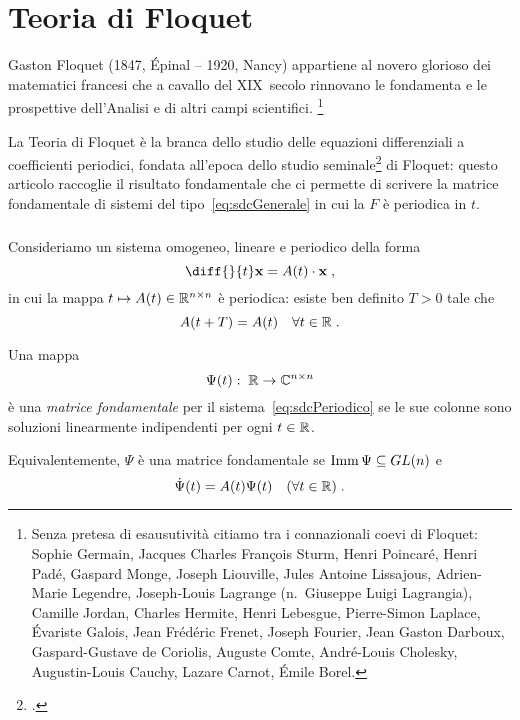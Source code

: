 \chapter{Teoria di Floquet}
\label{chap:floquetTheory}
Gaston Floquet (1847, Épinal -- 1920, Nancy)
appartiene al novero glorioso dei matematici francesi che a cavallo del XIX~secolo rinnovano
le fondamenta e le prospettive dell'Analisi e di altri campi scientifici.
\footnote{Senza pretesa di esausutività citiamo tra i connazionali coevi di Floquet: Sophie Germain,
Jacques Charles François Sturm, Henri Poincaré, Henri Padé, Gaspard Monge, Joseph Liouville,
Jules Antoine Lissajous, Adrien-Marie Legendre, Joseph-Louis Lagrange (n.~Giuseppe Luigi Lagrangia),
Camille Jordan, Charles Hermite, Henri Lebesgue, Pierre-Simon Laplace,
Évariste Galois, Jean Frédéric Frenet, Joseph Fourier, Jean Gaston Darboux, Gaspard-Gustave de Coriolis,
Auguste Comte, André-Louis Cholesky, Augustin-Louis Cauchy, Lazare Carnot, Émile Borel.}

La Teoria di Floquet è la branca dello studio delle equazioni differenziali a coefficienti periodici,
fondata all'epoca dello studio seminale\footcite{gFloquet} di Floquet: questo articolo raccoglie il
risultato fondamentale che ci permette di scrivere la matrice fondamentale di sistemi del tipo~\eqref{eq:sdcGenerale}
in cui la $F$ è periodica in $t$.

\paragraph{}
Consideriamo un sistema omogeneo, lineare e periodico della forma
\begin{equation}
    \diff{}{t} \mathbf{x} = A(t) \cdot \mathbf{x} \; ,
    \label{eq:sdcPeriodico}
\end{equation}
in cui la mappa $t \mapsto A(t) \in \mathbb{R}^{n \times n}$ è periodica: esiste ben definito $T >0$ tale che
$$A(t+T) =A(t) \quad \forall t \in \mathbb{R} \; .$$

\begin{definizione}
    Una mappa
    $$\Psi (t) : \; \mathbb{R} \rightarrow \mathbb{C}^{n \times n}$$
    è una \emph{matrice fondamentale} per il sistema~\eqref{eq:sdcPeriodico} se le sue colonne sono soluzioni
    linearmente indipendenti per ogni $t \in \mathbb{R}$.
\end{definizione}
Equivalentemente, $\Psi$ è una matrice fondamentale se $\operatorname{Imm} \Psi \subseteq GL(n)$ e
$$ \dot{\Psi} (t) = A(t) \Psi (t) \quad (\forall t \in \mathbb{R}) \; .$$


